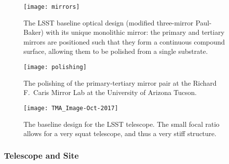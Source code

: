 \begin{figure}
\texttt{[image: mirrors]}
\caption{The LSST baseline optical design (modified three-mirror
  Paul-Baker) with its unique
monolithic mirror: the primary and tertiary mirrors are positioned such
that they form a continuous compound surface, allowing them to be polished
from a single substrate.}
\label{Fig:optics}
\end{figure}


\begin{figure}
\texttt{[image: polishing]}
\caption{The polishing of the primary-tertiary mirror pair at the Richard F.\ Caris Mirror Lab at the University of Arizona Tucson. }
\label{Fig:polishing}
\end{figure}




\begin{figure}
\texttt{[image: TMA\_Image-Oct-2017]}
\caption{The baseline design for the
LSST telescope.  The small focal ratio allows for a very squat
telescope, and thus a very stiff structure.  }
\label{Fig:telescope}
\end{figure}



\subsubsection{ Telescope and Site}


